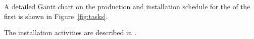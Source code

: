 A detailed Gantt chart on the production and installation schedule for the  of the first  is shown in Figure~\ref{fig:tasks}.

The installation activities are described in \spchinstall{}.

